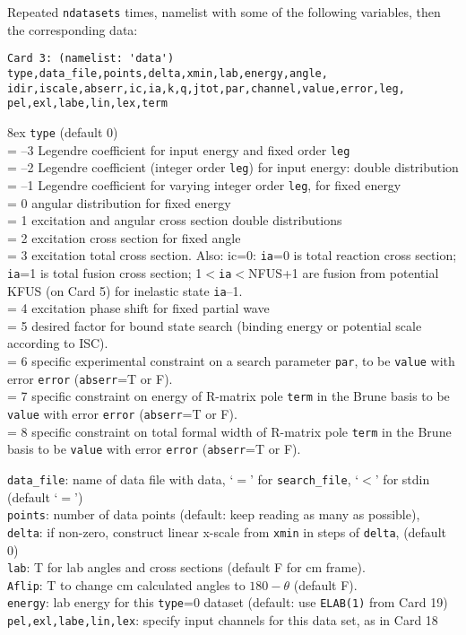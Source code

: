 \documentclass[11pt]{article}
\begin{document}
Repeated {\tt ndatasets} times, namelist with some of the following variables, then the
corresponding data:
\begin{verbatim}
Card 3: (namelist: 'data')
type,data_file,points,delta,xmin,lab,energy,angle,
idir,iscale,abserr,ic,ia,k,q,jtot,par,channel,value,error,leg,
pel,exl,labe,lin,lex,term
\end{verbatim}

\hangindent 8ex
{\tt type} (default 0)
\\ = --3 Legendre coefficient for input energy and fixed order {\tt leg}
\\ = --2 Legendre coefficient (integer order {\tt leg}) for input energy: double distribution
\\ = --1 Legendre coefficient for varying integer order {\tt leg}, for fixed energy
\\ = 0 angular distribution for fixed energy
\\ = 1 excitation and angular cross section double distributions
\\ = 2 excitation cross section for fixed angle
\\ = 3 excitation total cross section. Also: ic=0: {\tt ia}=0 is total reaction cross section;
{\tt ia}=1 is total fusion cross section; 1$<${\tt ia}$<$NFUS+1 are fusion from potential
KFUS (on Card 5) for inelastic state {\tt ia}--1.
\\ = 4 excitation phase shift for fixed partial wave
\\ = 5 desired factor for bound state search (binding energy or potential scale
 according to ISC).
\\ = 6 specific experimental constraint on a search parameter {\tt par},
    to be {\tt value} with error {\tt error} ({\tt abserr}=T or F).
\\ = 7 specific constraint on energy of R-matrix pole {\tt term} in the Brune basis 
    to be {\tt value} with error {\tt error} ({\tt abserr}=T or F).
\\ = 8 specific constraint on total formal width of R-matrix pole {\tt term} in the Brune basis 
    to be {\tt value} with error {\tt error} ({\tt abserr}=T or F).


{\tt data\_file}: name of data file with data, `$=$' for {\tt search\_file},
 `$<$' for stdin (default `$=$')\\
{\tt points}: number of data points (default: keep reading as many as possible),
\\
{\tt delta}: if non-zero, construct linear x-scale from {\tt xmin} in steps of {\tt delta},
 (default 0)\\
{\tt lab}: T  for lab angles and cross sections (default F for cm frame).\\
{\tt Aflip}: T to change cm calculated angles to $180-\theta$ (default F).\\
{\tt energy}: lab energy for this {\tt type}=0 dataset (default: use {\tt ELAB(1)} from Card 19)\\{\tt pel,exl,labe,lin,lex}: specify input channels for this data set, as in Card 18
\end{document}
